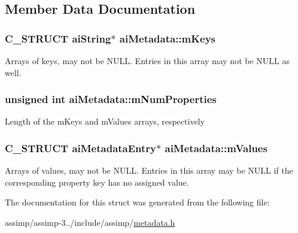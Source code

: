 \subsection{Member Data Documentation}
\hypertarget{structai_metadata_aa8c77a263443658737ee51a74e3c292e}{
\subsubsection[{m\+Keys}]{\setlength{\rightskip}{0pt plus 5cm}C\+\_\+\+S\+T\+R\+U\+C\+T {\bf ai\+String}$\ast$ ai\+Metadata\+::m\+Keys}}\label{structai_metadata_aa8c77a263443658737ee51a74e3c292e}
Arrays of keys, may not be N\+U\+L\+L. Entries in this array may not be N\+U\+L\+L as well. \hypertarget{structai_metadata_a32c4587c53dd402a5878ffc94088e528}{
\subsubsection[{m\+Num\+Properties}]{\setlength{\rightskip}{0pt plus 5cm}unsigned int ai\+Metadata\+::m\+Num\+Properties}}\label{structai_metadata_a32c4587c53dd402a5878ffc94088e528}
Length of the m\+Keys and m\+Values arrays, respectively \hypertarget{structai_metadata_a34b515fcb5b806c471d3c6ce7bc76beb}{
\subsubsection[{m\+Values}]{\setlength{\rightskip}{0pt plus 5cm}C\+\_\+\+S\+T\+R\+U\+C\+T {\bf ai\+Metadata\+Entry}$\ast$ ai\+Metadata\+::m\+Values}}\label{structai_metadata_a34b515fcb5b806c471d3c6ce7bc76beb}
Arrays of values, may not be N\+U\+L\+L. Entries in this array may be N\+U\+L\+L if the corresponding property key has no assigned value. 

The documentation for this struct was generated from the following file\+:\begin{DoxyCompactItemize}
\item 
assimp/assimp-\/3../include/assimp/\hyperlink{metadata_8h}{metadata.\+h}\end{DoxyCompactItemize}

